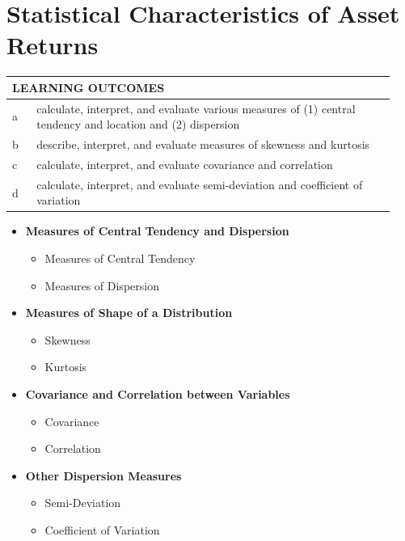 \chapter{Statistical Characteristics of Asset Returns}
\label{chap:Statistical Characteristics of Asset Returns}

\begin{center}
\begin{tabular}{p{0.06\linewidth} | p{0.88\linewidth}}
	\toprule
	\multicolumn{2}{l}{\textbf{LEARNING OUTCOMES}} \\
	\midrule
	a & calculate, interpret, and evaluate various measures of (1) central tendency and location and (2) dispersion \\
	\midrule
	b & describe, interpret, and evaluate measures of skewness and kurtosis \\
	\midrule
	c & calculate, interpret, and evaluate covariance and correlation \\
	\midrule
	d & calculate, interpret, and evaluate semi-deviation and coefficient of variation \\
	\bottomrule
\end{tabular}
\end{center}

\vspace{1.5em}

\begin{itemize}
	\item[] \textbf{Measures of Central Tendency and Dispersion}
	      \begin{itemize}
		      \item[] Measures of Central Tendency
		      \item[] Measures of Dispersion
	      \end{itemize}
	\item[] \textbf{Measures of Shape of a Distribution}
	      \begin{itemize}
		      \item[] Skewness
		      \item[] Kurtosis
	      \end{itemize}
	\item[] \textbf{Covariance and Correlation between Variables}
	      \begin{itemize}
		      \item[] Covariance
		      \item[] Correlation
	      \end{itemize}
	\item[] \textbf{Other Dispersion Measures}
	      \begin{itemize}
		      \item[] Semi-Deviation
		      \item[] Coefficient of Variation
	      \end{itemize}
\end{itemize}

